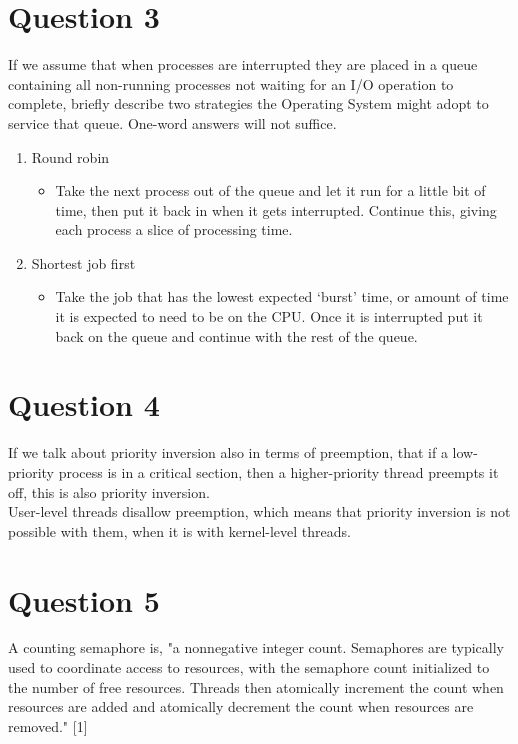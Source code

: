 \documentclass[12pt]{article}
\begin{document}
	\section*{Question 3}
	If we assume that when processes are interrupted they are placed in a
	queue containing all non-running processes not waiting for an I/O operation to complete, briefly
	describe two strategies the Operating System might adopt to service that queue. One-word
	answers will not suffice.
	\begin{enumerate}
		\item Round robin
		\begin{itemize}
			\item Take the next process out of the queue and let it run for a little bit of time, then put it back in when it gets interrupted. Continue this, giving each process a slice of processing time.
		\end{itemize}
	
		\item Shortest job first
		\begin{itemize}
			\item Take the job that has the lowest expected `burst' time, or amount of time it is expected to need to be on the CPU. Once it is interrupted put it back on the queue and continue with the rest of the queue.
		\end{itemize}
	\end{enumerate}
	
	\section*{Question 4}
	If we talk about priority inversion also in terms of preemption, that if a low-priority process is in a critical section, then a higher-priority thread preempts it off, this is also priority inversion.\\
	User-level threads disallow preemption, which means that priority inversion is not possible with them, when it is with kernel-level threads.
	
	
	\section*{Question 5}	
	A counting semaphore is, "a nonnegative integer count. Semaphores are typically used to coordinate access to resources, with the semaphore count initialized to the number of free resources. Threads then atomically increment the count when resources are added and atomically decrement the count when resources are removed." [1]
	
\end{document}
